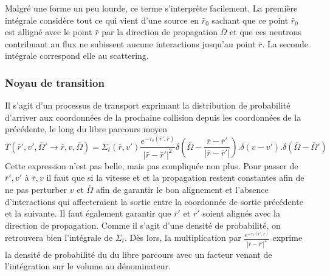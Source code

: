 Malgré une forme un peu lourde, ce terme s'interprète facilement. La première intégrale considère 
tout ce qui vient d'une source en $\bar r_0$ sachant que ce point $\bar r_0$ est alligné avec 
le point $\bar r$ par la direction de propagation $\bar\Omega$ et que ces neutrons contribuant au 
flux ne subissent aucune interactions jusqu'au point $\bar r$. La seconde intégrale correspond elle 
au scattering.


\subsubsection{Noyau de transition}
Il s'agit d'un processus de transport exprimant la distribution de probabilité d'arriver aux 
coordonnées de la prochaine collision depuis les coordonnées de la précédente, le long du libre 
parcours moyen
\begin{equation}
T(\bar r',v',\bar \Omega ' \to \bar r,v,\bar \Omega ) = {\Sigma _t}(\bar r,v')\frac{{{e^{ - {\tau _v}(\bar r',\bar r)}}}}{{{{\left| {\bar r - \bar r'} \right|}^2}}}\delta \left( {\bar \Omega  - \frac{{\bar r - \bar r'}}{{\left| {\bar r - \bar r'} \right|}}} \right).\delta (v - v').\delta (\bar \Omega  - \bar \Omega ')
\end{equation}
Cette expression n'est pas belle, mais pas compliquée non plus. Pour passer de $\bar r', v'$ à 
$\bar r, v$ il faut que si la vitesse et et la propagation restent constantes afin de ne pas 
perturber $v$ et $\bar\Omega$ afin de garantir le bon alignement et l'absence d'interactions 
qui affecteraient la sortie entre la coordonnée de sortie précédente et la suivante. Il faut 
également garantir que $\bar r'$ et $\bar{r'}$ soient alignés avec la direction de propagation. 
Comme il s'agit d'une densité de probabilité, on retrouvera bien l'intégrale de $\Sigma_t$. Dès 
lors, la multiplication par $\frac{{{e^{ - {\tau _v}(\bar r',\bar r)}}}}{|\bar r - \bar r'|^2}$
exprime la densité de probabilité du du libre parcours avec un facteur venant de l'intégration sur le volume au dénominateur.


\newpage
